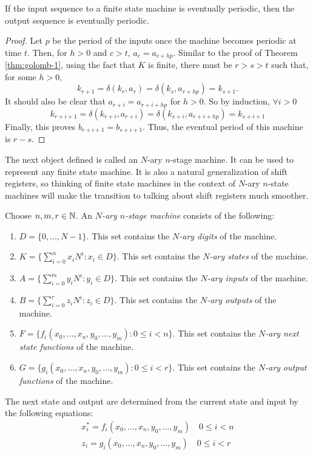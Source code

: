 \begin{theorem}\label{thm:golomb-2}
  If the input sequence to a finite state machine is eventually periodic, then the
  output sequence is eventually periodic.
\end{theorem}
\begin{proof}
  Let $p$ be the period of the inputs once the machine becomes periodic at time $t$.
  Then, for $h>0$ and $c>t$, $a_c=a_{c+hp}$. Similar to the proof of Theorem
  \ref{thm:golomb-1}, using the fact that $K$ is finite, there must be
  $r>s>t$ such that, for some $h>0$,
  \[
  k_{r+1}=\delta(k_r,a_r)=\delta(k_s,a_{r+hp})=k_{s+1}.
  \]
  It should also be clear that $a_{r+i}=a_{r+i+hp}$ for $h>0$. So by induction,
  $\forall i>0$
  \[
  k_{r+i+1}=\delta(k_{r+i},a_{r+i})=\delta(k_{s+i},a_{r+i+hp})=k_{s+i+1}
  \]
  Finally, this proves $b_{r+i+1}=b_{s+i+1}$. Thus, the eventual period of this
  machine is $r-s$.
\end{proof}

\par The next object defined is called an $N$-ary $n$-stage machine. It can be used
to represent any finite state machine. It is also a natural generalization of
shift registers, so thinking of finite state machines in the context of $N$-ary
$n$-state machines will make the transition to talking about shift registers much
smoother.

\begin{definition}\label{N-ary-n-stage-machine}
  Choose $n,m,r\in\mathbb{N}$. An {\em $N$-ary $n$-stage machine} consists of the
  following:
  \begin{enumerate}[1.]
    \item $D=\{0,\dots,N-1\}$. This set contains the {\em $N$-ary digits} of the
      machine.
    \item $K=\{\sum_{i=0}^{n}x_iN^i:x_i\in D\}$. This set contains the
      {\em $N$-ary states} of the machine.
    \item $A=\{\sum_{i=0}^{m}y_iN^i:y_i\in D\}$. This set contains the
      {\em $N$-ary inputs} of the machine.
    \item $B=\{\sum_{i=0}^{r}z_iN^i:z_i\in D\}$. This set contains the
      {\em $N$-ary outputs} of the machine.
    \item $F=\{f_i(x_0,\dots,x_n,y_0,\dots,y_m):0\le i<n\}$. This set contains
      the {\em $N$-ary next state functions} of the machine.
    \item $G=\{g_i(x_0,\dots,x_n,y_0,\dots,y_m):0\le i<r\}$. This set contains
      the {\em $N$-ary output functions} of the machine.
  \end{enumerate}
  The next state and output are determined from the current state and input by the
  following equations:
  \begin{eqnarray}
    x_i^*=f_i(x_0,\dots,x_n,y_0,\dots,y_m) \quad 0\le i<n \\
    z_i=g_i(x_0,\dots,x_n,y_0,\dots,y_m) \quad 0\le i<r
  \end{eqnarray}
\end{definition}
